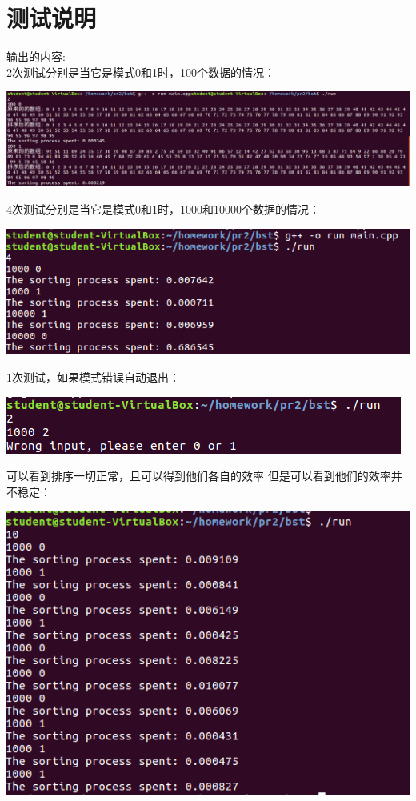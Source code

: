 \documentclass{ctexart}
\begin{document}
\section{测试说明}
输出的内容:\\
2次测试分别是当它是模式0和1时，100个数据的情况：
\begin{center}
  \includegraphics[scale=0.5]{ss1.png}
\end{center}
4次测试分别是当它是模式0和1时，1000和10000个数据的情况：
\begin{center}
  \includegraphics[scale=0.5]{ss2.png}
\end{center}
1次测试，如果模式错误自动退出：
\begin{center}
  \includegraphics[scale=0.5]{ss3.png}
\end{center}
可以看到排序一切正常，且可以得到他们各自的效率
但是可以看到他们的效率并不稳定：
\begin{center}
  \includegraphics[scale=0.5]{ss4.png}
\end{center}
\end{document}
